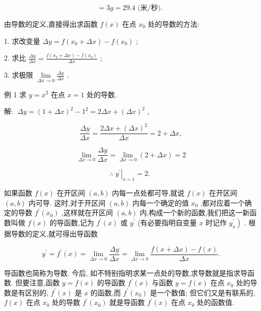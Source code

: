 \documentclass[lang=cn,newtx,10pt,scheme=chinese]{elegantbook}
\begin{document}
\[
= {3g} = {29.4}\text{ (米/秒). }
\]

由导数的定义,直接得出求函数 \(f\left( x\right)\) 在点 \({x}_{0}\) 处的导数的方法:

1. 求改变量 \({\Delta y} = f\left( {{x}_{0} + {\Delta x}}\right) - f\left( {x}_{0}\right)\) ;

2. 求比 \(\frac{\Delta y}{\Delta x} = \frac{f\left( {{x}_{0} + {\Delta x}}\right) - f\left( {x}_{0}\right) }{\Delta x}\) ;

3. 求极限 \(\mathop{\lim }\limits_{{{\Delta x} \rightarrow 0}}\frac{\Delta y}{\Delta x}\) .

例 1 求 \(y = {x}^{2}\) 在点 \(x = 1\) 处的导数.

解: \(\;{\Delta y} = {\left( 1 + \Delta x\right) }^{2} - {1}^{2} = {2\Delta x} + {\left( \Delta x\right) }^{2}\) ,

\[
\frac{\Delta y}{\Delta x} = \frac{{2\Delta x} + {\left( \Delta x\right) }^{2}}{\Delta x} = 2 + {\Delta x},
\]

\[
\mathop{\lim }\limits_{{{\Delta x} \rightarrow 0}}\frac{\Delta y}{\Delta x} = \mathop{\lim }\limits_{{{\Delta x} \rightarrow 0}}\left( {2 + {\Delta x}}\right) = 2
\]

\[
\therefore {\left. \;{y}^{\prime }\right| }_{x = 1} = 2\text{. }
\]

如果函数 \(f\left( x\right)\) 在开区间 \(\left( {a,b}\right)\) 内每一点处都可导,就说 \(f\left( x\right)\) 在开区间 \(\left( {a,b}\right)\) 内可导. 这时,对于开区间 \(\left( {a,b}\right)\) 内每一个确定的值 \({x}_{0}\) ,都对应着一个确定的导数 \({f}^{\prime }\left( {x}_{0}\right)\) ,这样就在开区间 \(\left( {a,b}\right)\) 内,构成一个新的函数,我们把这一新函数叫做 \(f\left( x\right)\) 的导函数,记为 \({f}^{\prime }\left( x\right)\) 或 \({y}^{\prime }\) (有必要指明自变量 \(x\) 时记作 \(\left. {y}_{x}^{\prime }\right)\) . 根据导数的定义,就可得出导函数

\[
{y}^{\prime } = {f}^{\prime }\left( x\right) = \mathop{\lim }\limits_{{{\Delta x} \rightarrow 0}}\frac{\Delta y}{\Delta x} = \mathop{\lim }\limits_{{{\Delta x} \rightarrow 0}}\frac{f\left( {x + {\Delta x}}\right) - f\left( x\right) }{\Delta x}. \tag{2}
\]

导函数也简称为导数. 今后, 如不特别指明求某一点处的导数,求导数就是指求导函数. 但要注意,函数 \(y = f\left( x\right)\) 的导函数 \({f}^{\prime }\left( x\right)\) 与函数 \(y = f\left( x\right)\) 在点 \({x}_{0}\) 处的导数是有区别的, \({f}^{\prime }\left( x\right)\) 是 \(x\) 的函数,而 \({f}^{\prime }\left( {x}_{0}\right)\) 是一个数值; 但它们又是有联系的, \(f\left( x\right)\) 在点 \({x}_{0}\) 处的导数 \({f}^{\prime }\left( {x}_{0}\right)\) 就是导函数 \({f}^{\prime }\left( x\right)\) 在点 \({x}_{0}\) 处的函数值.
\end{document}
